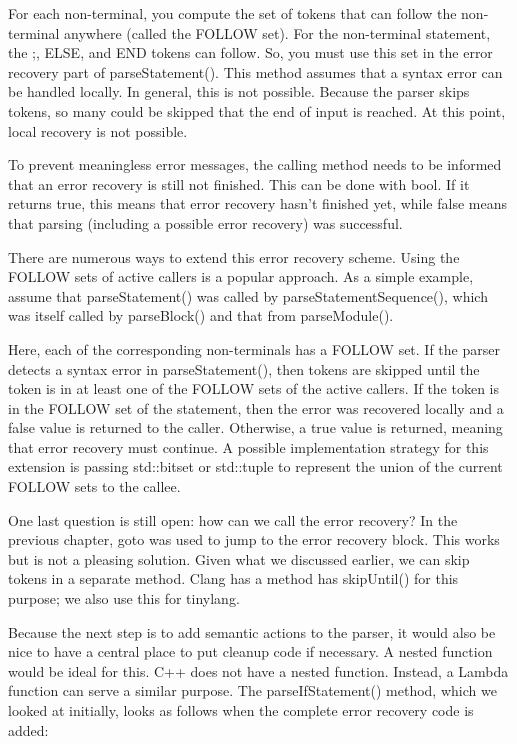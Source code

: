 For each non-terminal, you compute the set of tokens that can follow the non-terminal anywhere (called the FOLLOW set). For the non-terminal statement, the ;, ELSE, and END tokens can follow. So, you must use this set in the error recovery part of parseStatement(). This method assumes that a syntax error can be handled locally. In general, this is not possible. Because the parser skips tokens, so many could be skipped that the end of input is reached. At this point, local recovery is not possible.

To prevent meaningless error messages, the calling method needs to be informed that an error recovery is still not finished. This can be done with bool. If it returns true, this means that error recovery hasn’t finished yet, while false means that parsing (including a possible error recovery) was successful.

There are numerous ways to extend this error recovery scheme. Using the FOLLOW sets of active callers is a popular approach. As a simple example, assume that parseStatement() was called by parseStatementSequence(), which was itself called by parseBlock() and that from parseModule().

Here, each of the corresponding non-terminals has a FOLLOW set. If the parser detects a syntax error in parseStatement(), then tokens are skipped until the token is in at least one of the FOLLOW sets of the active callers. If the token is in the FOLLOW set of the statement, then the error was recovered locally and a false value is returned to the caller. Otherwise, a true value is returned, meaning that error recovery must continue. A possible implementation strategy for this extension is passing std::bitset or std::tuple to represent the union of the current FOLLOW sets to the callee.

One last question is still open: how can we call the error recovery? In the previous chapter, goto was used to jump to the error recovery block. This works but is not a pleasing solution. Given what we discussed earlier, we can skip tokens in a separate method. Clang has a method has skipUntil() for this purpose; we also use this for tinylang.

Because the next step is to add semantic actions to the parser, it would also be nice to have a central place to put cleanup code if necessary. A nested function would be ideal for this. C++ does not have a nested function. Instead, a Lambda function can serve a similar purpose. The parseIfStatement() method, which we looked at initially, looks as follows when the complete error recovery code is added:

